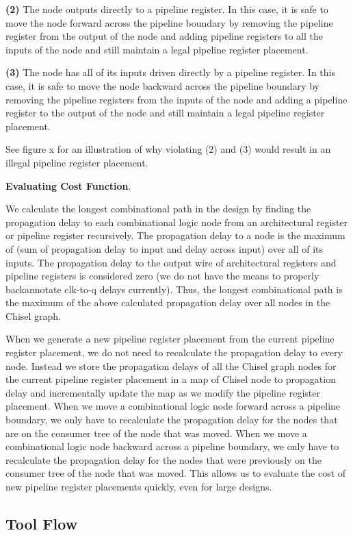 {\bf (2)}  
The node outputs directly to a pipeline register. In this case, it is safe to move the node forward across the pipeline boundary by removing the pipeline register from the output of the node and adding pipeline registers to all the inputs of the node and still maintain a legal pipeline register placement. 

{\bf (3)} 
The node has all of its inputs driven directly by a pipeline register. In this case, it is safe to move the node backward across the pipeline boundary by removing the pipeline registers from the inputs of the node and adding a pipeline register to the output of the node and still maintain a legal pipeline register placement.

See figure x for an illustration of why violating (2) and (3) would result in an illegal pipeline register placement.

{\bf Evaluating Cost Function}.

We calculate the longest combinational path in the design by finding the propagation delay to each combinational logic node from an architectural register or pipeline register recursively. The propagation delay to a node is the maximum of (sum of propagation delay to input and delay across input) over all of its inputs. The propagation delay to the output wire of architectural registers and pipeline registers is considered zero (we do not have the means to properly backannotate clk-to-q delays currently).  Thus, the longest combinational path is the maximum of the above calculated propagation delay over all nodes in the Chisel graph.

When we generate a new pipeline register placement from the current pipeline register placement, we do not need to recalculate the propagation delay to every node. Instead we store the propagation delays of all the Chisel graph nodes for the current pipeline register placement in a map of Chisel node to propagation delay and incrementally update the map as we modify the pipeline register placement. When we move a combinational logic node forward across a pipeline boundary, we only have to recalculate the propagation delay for the nodes that are on the consumer tree of the node that was moved. When we move a combinational logic node backward across a pipeline boundary, we only have to recalculate the propagation delay for the nodes that were previously on the consumer tree of the node that was moved. This allows us to evaluate the cost of new pipeline register placements quickly, even for large designs.


\subsection{Tool Flow}



